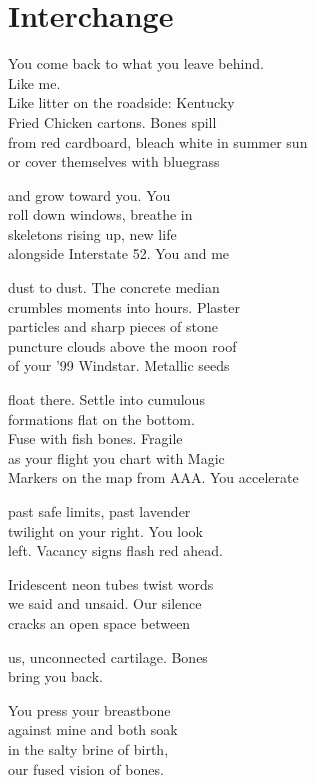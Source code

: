 \documentclass[twoside,10pt]{book}
\begin{document}
\clearpage
\section{Interchange}

You come back to what you leave behind.\\
Like me.\\
Like litter on the roadside: Kentucky\\
Fried Chicken cartons. Bones spill\\
from red cardboard, bleach white in summer sun\\
or cover themselves with bluegrass

and grow toward you. You\\
roll down windows, breathe in\\
skeletons rising up, new life\\
alongside Interstate 52. You and me

dust to dust. The concrete median\\
crumbles moments into hours. Plaster\\
particles and sharp pieces of stone\\
puncture clouds above the moon roof\\
of your '99 Windstar. Metallic seeds

float there. Settle into cumulous\\
formations flat on the bottom.\\
Fuse with fish bones. Fragile\\
as your flight you chart with Magic\\
Markers on the map from AAA. You accelerate

past safe limits, past lavender\\
twilight on your right. You look\\
left. Vacancy signs flash red ahead.

Iridescent neon tubes twist words\\
we said and unsaid. Our silence\\
cracks an open space between

us, unconnected cartilage. Bones\\
bring you back.

You press your breastbone\\
against mine and both soak\\
in the salty brine of birth,\\
our fused vision of bones.
\end{document}
